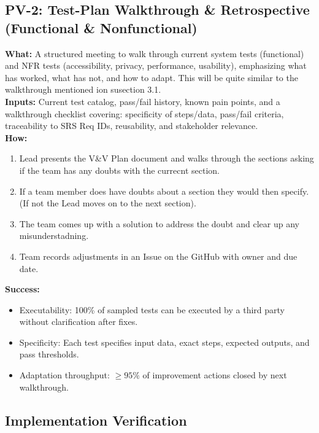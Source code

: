 \documentclass[12pt, titlepage]{article}
\begin{document}
\subsection*{PV-2: Test-Plan Walkthrough \& Retrospective (Functional \& Nonfunctional)}
\textbf{What:} A structured meeting to walk through current system tests (functional) and NFR tests (accessibility, privacy, performance, usability), emphasizing what has worked, what has not, and how to adapt. This will be quite similar to the walkthrough mentioned ion susection 3.1. \\
\textbf{Inputs:} Current test catalog, pass/fail history, known pain points, and a walkthrough checklist covering: specificity of steps/data, pass/fail criteria, traceability to SRS Req IDs, reusability, and stakeholder relevance. \\
\textbf{How:}
\begin{enumerate}
  \item Lead presents the V\&V Plan document and walks through the sections asking if the team has any doubts with the currecnt section.
  \item If a team member does have doubts about a section they would then specify. (If not the Lead moves on to the next section).
  \item The team comes up with a solution to address the doubt and clear up any misunderstadning.
  \item Team records adjustments in an Issue on the GitHub with owner and due date.
\end{enumerate}
\textbf{Success:}
\begin{itemize}
  \item Executability: 100\% of sampled tests can be executed by a third party without clarification after fixes.
  \item Specificity: Each test specifies input data, exact steps, expected outputs, and pass thresholds.
  \item Adaptation throughput: $\geq 95\%$ of improvement actions closed by next walkthrough.
\end{itemize}


\subsection{Implementation Verification}


\end{document}
